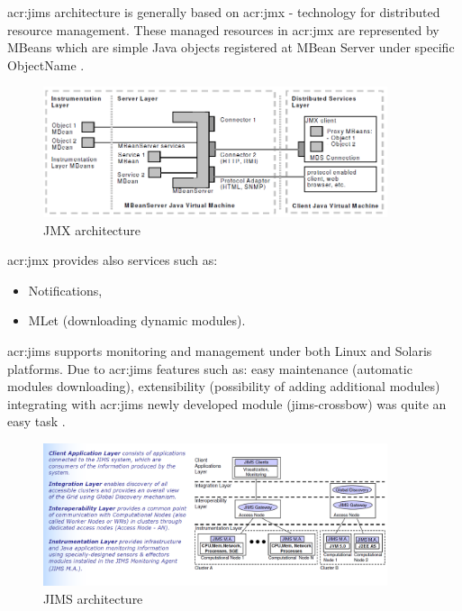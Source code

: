 \documentclass[11pt]{book}
\begin{document}
      \gls{acr:jims} architecture is generally based on \gls{acr:jmx} - technology for distributed resource management.
      These managed resources in \gls{acr:jmx} are represented by MBeans which are simple Java objects registered at MBean Server
      under specific ObjectName \cite{jims}.
    
      \begin{figure}[H]
        \begin{center}
          \includegraphics[width=0.9\textwidth]{img/jims/jmx.png}
        \end{center}
        \caption{JMX architecture \cite{jims}}
      \end{figure}
	
      \gls{acr:jmx} provides also services such as:

      \begin{itemize}
        \item Notifications,
        \item MLet (downloading dynamic modules).
      \end{itemize}
	
      \gls{acr:jims} supports monitoring and management under both Linux and Solaris
      platforms.  Due to \gls{acr:jims} features such as: easy maintenance (automatic modules downloading), extensibility
      (possibility of adding additional modules) integrating with \gls{acr:jims} newly developed module (jims-crossbow) was quite
      an easy task \cite{jims}.
    
      \begin{figure}[H]
        \begin{center}
          \includegraphics[width=0.9\textwidth]{img/jims/jims.png}
        \end{center}
        \caption{JIMS architecture \cite{jims}}
      \end{figure}
	 
\end{document}
